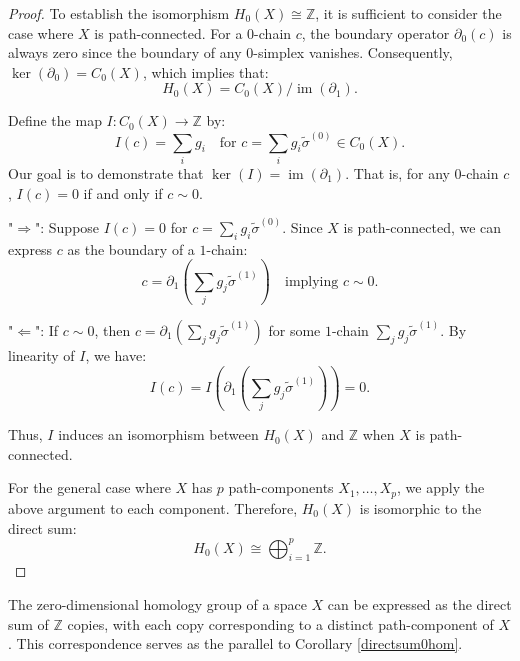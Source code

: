 \begin{proof}
    To establish the isomorphism $H_0(X) \cong \mathbb{Z}$, it is sufficient to consider the case where $X$ is path-connected. For a $0$-chain $c$, the boundary operator $\partial_0(c)$ is always zero since the boundary of any $0$-simplex vanishes. Consequently, $\ker(\partial_0) = C_0(X)$, which implies that:
    \[
        H_0(X) = C_0(X) / \operatorname{im}(\partial_1).
    \]

    Define the map $I: C_0(X) \to \mathbb{Z}$ by:
    \[
        I(c) = \sum_i g_i \quad \text{for } c = \sum_i g_i \tilde{\sigma}^{(0)} \in C_0(X).
    \]
    Our goal is to demonstrate that $\ker(I) = \operatorname{im}(\partial_1)$. That is, for any $0$-chain $c$, $I(c) = 0$ if and only if $c \sim 0$.

    "$\Rightarrow$": Suppose $I(c) = 0$ for $c = \sum_i g_i \tilde{\sigma}^{(0)}$. Since $X$ is path-connected, we can express $c$ as the boundary of a $1$-chain:
    \[
        c = \partial_1 \left( \sum_j g_j \tilde{\sigma}^{(1)} \right) \quad \text{implying } c \sim 0.
    \]

    "$\Leftarrow$": If $c \sim 0$, then $c = \partial_1 \left( \sum_j g_j \tilde{\sigma}^{(1)} \right)$ for some $1$-chain $\sum_j g_j \tilde{\sigma}^{(1)}$. By linearity of $I$, we have:
    \[
        I(c) = I \left( \partial_1 \left( \sum_j g_j \tilde{\sigma}^{(1)} \right) \right) = 0.
    \]

    Thus, $I$ induces an isomorphism between $H_0(X)$ and $\mathbb{Z}$ when $X$ is path-connected.

    For the general case where $X$ has $p$ path-components $X_1, \ldots, X_p$, we apply the above argument to each component. Therefore, $H_0(X)$ is isomorphic to the direct sum:
    \[
        H_0(X) \cong \bigoplus_{i=1}^{p} \mathbb{Z}.
    \]
\end{proof}

\begin{proposition}
    The zero-dimensional homology group of a space $X$ can be expressed as the direct sum of $\mathbb{Z}$ copies, with each copy corresponding to a distinct path-component of $X$. This correspondence serves as the parallel to Corollary \ref{directsum0hom}.
\end{proposition}

